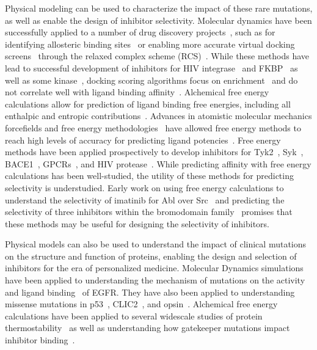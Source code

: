 \documentclass[phd,tocprelim]{cornell}
\begin{document}
Physical modeling can be used to characterize the impact of these rare mutations, as well as enable the design of inhibitor selectivity. Molecular dynamics have been successfully applied to a number of drug discovery projects~\citep{Durrant:2011bm}, such as for identifying allosteric binding sites~\citep{Lin:2003im} or enabling more accurate virtual docking screens~\citep{Kitchen:2004hq} through the relaxed complex scheme (RCS)~\citep{Lin:2003im,Amaro:2008hk}. While these methods have lead to successful development of inhibitors for HIV integrase~\citep{Hazuda:2004ja} and FKBP~\citep{Lin:2003im} as well as some kinase~\citep{Norman:2012gwa},  docking scoring algorithms focus on enrichment~\citep{Shoichet:2004jha} and do not correlate well with ligand binding affinity~\cite{Warren:2006jh}. Alchemical free energy calculations allow for prediction of ligand binding free energies, including all enthalpic and entropic contributions~\citep{Chodera2011-jn,Aldeghi:2016et,Mikulskis:2014df}. Advances in atomistic molecular mechanics forcefields and free energy methodologies~\citep{Huang:J.Comput.Chem.:2013,Maier:J.Chem.TheoryComput.:2015,Harder:J.Chem.TheoryComput.:2016,Cournia:2017ip} have allowed free energy methods to reach high levels of accuracy for predicting ligand potencies~\citep{BROWN2009420}. Free energy methods have been applied prospectively to develop inhibitors for Tyk2~\citep{Abel2017-gw}, Syk~\citep{Lovering:2016fg}, BACE1~\citep{Ciordia:2016dn}, GPCRs~\citep{Lenselink:2016ip}, and HIV protease~\citep{Jorgensen:2016dv}. While predicting affinity with free energy calculations has been well-studied, the utility of these methods for predicting selectivity is understudied. Early work on using free energy calculations to understand the selectivity of imatinib for Abl over Src~\citep{Lin2013-ft,Lin2014-iv} and predicting the selectivity of three inhibitors within the bromodomain family~\citep{Aldeghi2017-ox} promises that these methods may be useful for designing the selectivity of inhibitors. 

Physical models can also be used to understand the impact of clinical mutations on the structure and function of proteins, enabling the design and selection of inhibitors for the era of personalized medicine. Molecular Dynamics simulations have been applied to understanding the mechanism of mutations on the activity~\citep{Shan:2012bs,Sutto:2013gy} and ligand binding~\citep{Park:2016ip} of EGFR. They have also been applied to understanding missense mutations in p53~\citep{Demir:2011bc}, CLIC2~\citep{Witham:2011co}, and opsin~\citep{Tsukamoto:2013gr}. Alchemical free energy calculations have been applied to several widescale studies of protein thermostability~\citep{Seeliger:2010hn,Steinbrecher:2017ge,Ford:2017bn} as well as understanding how gatekeeper mutations impact inhibitor binding~\citep{Mondal:2016ju}.
\end{document}
